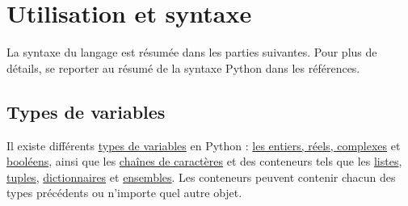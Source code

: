 \documentclass{article}
\begin{document}

\section{Utilisation et syntaxe}
La syntaxe du langage est résumée dans les parties suivantes. Pour plus de détails, se reporter au résumé de la syntaxe Python dans les références.

\subsection*{Types de variables}
Il existe différents \href{https://fr.wikibooks.org/wiki/Programmation_Python/Types}{types de variables} en Python : \href{https://fr.wikibooks.org/wiki/Programmation_Python/Num\%C3\%A9riques}{les entiers, réels, complexes} et \href{https://fr.wikibooks.org/wiki/Programmation_Python/Bool\%C3\%A9ens}{booléens}, ainsi que les \href{https://fr.wikibooks.org/wiki/Programmation_Python/Chaines_de_caract\%C3\%A8res}{chaînes de caractères} et des conteneurs tels que les \href{https://fr.wikibooks.org/wiki/Programmation_Python/Listes}{listes}, \href{https://fr.wikibooks.org/wiki/Programmation_Python/Tuples}{tuples}, \href{https://fr.wikibooks.org/wiki/Programmation_Python/Dictionnaires}{dictionnaires} et \href{https://fr.wikibooks.org/wiki/Programmation_Python/Ensembles}{ensembles}. Les conteneurs peuvent contenir chacun des types précédents ou n'importe quel autre objet.
\end{document}
